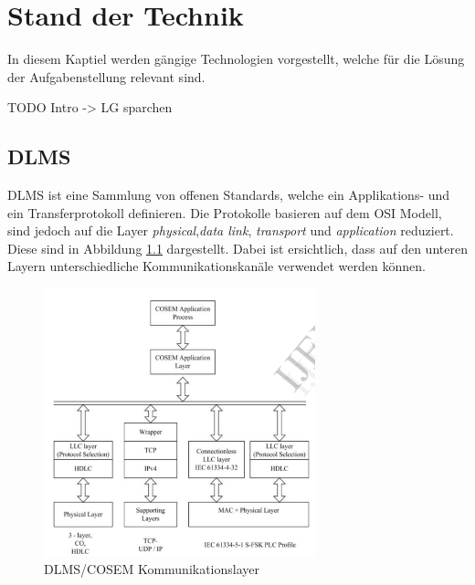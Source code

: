 \chapter{Stand der Technik}
In diesem Kaptiel werden gängige Technologien vorgestellt, welche für die Lösung der Aufgabenstellung relevant sind.


TODO Intro -> LG sparchen



\section{DLMS}
\ac{DLMS} ist eine Sammlung von offenen Standards, welche ein Applikations- und ein Transferprotokoll definieren.
Die Protokolle basieren auf dem \ac{OSI} Modell, sind jedoch auf die Layer \textit{physical},\textit{data link}, \textit{transport} und \textit{application} reduziert.
Diese sind in Abbildung \ref{fig:dlmsOsi} dargestellt.
Dabei ist ersichtlich, dass auf den unteren Layern unterschiedliche Kommunikationskanäle verwendet werden können.

\begin{figure}[H]
   \centering
   \includegraphics[width=0.7\textwidth]{gfx/Dlms_osi.png}
   \caption{
       DLMS/COSEM Kommunikationslayer
   }
   \label{fig:dlmsOsi}
\end{figure}

